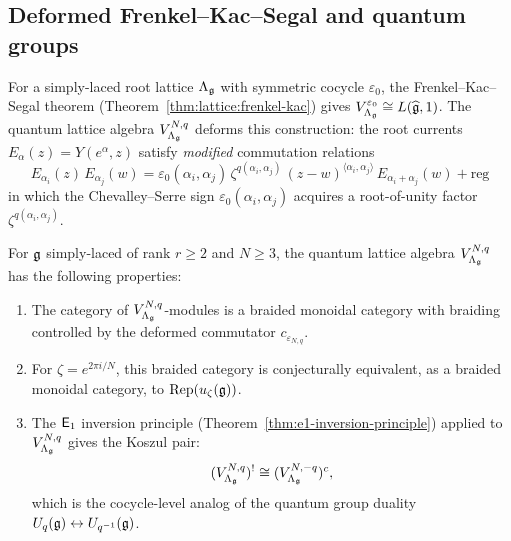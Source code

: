 \subsection{Deformed Frenkel--Kac--Segal and quantum groups}

\begin{remark}\label{rem:lattice:deformed-fks}
For a simply-laced root lattice $\Lambda_{\mathfrak{g}}$ with symmetric cocycle
$\varepsilon_0$, the Frenkel--Kac--Segal theorem
(Theorem~\ref{thm:lattice:frenkel-kac}) gives
$V_{\Lambda_{\mathfrak{g}}}^{\varepsilon_0} \cong L(\widehat{\mathfrak{g}}, 1)$.
The quantum lattice algebra $V_{\Lambda_{\mathfrak{g}}}^{N,q}$ deforms this
construction: the root currents $E_\alpha(z) = Y(e^\alpha, z)$
satisfy \emph{modified} commutation relations
\begin{equation}\label{eq:lattice:deformed-fks-ope}
E_{\alpha_i}(z)\, E_{\alpha_j}(w)
= \varepsilon_0(\alpha_i,\alpha_j)\,\zeta^{q(\alpha_i,\alpha_j)}\,
  (z-w)^{\langle\alpha_i,\alpha_j\rangle}\,
  E_{\alpha_i+\alpha_j}(w) + \text{reg}
\end{equation}
in which the Chevalley--Serre sign
$\varepsilon_0(\alpha_i,\alpha_j)$ acquires a root-of-unity factor
$\zeta^{q(\alpha_i,\alpha_j)}$.
\end{remark}

\begin{conjecture}
\label{conj:lattice:quantum-group-connection}
For $\mathfrak{g}$ simply-laced of rank $r \geq 2$ and $N \geq 3$, the quantum
lattice algebra $V_{\Lambda_{\mathfrak{g}}}^{N,q}$ has the following properties:
\begin{enumerate}[label=(\roman*)]
\item The category of $V_{\Lambda_{\mathfrak{g}}}^{N,q}$-modules is a
  braided monoidal category with braiding controlled by the
  deformed commutator $c_{\varepsilon_{N,q}}$.
\item For $\zeta = e^{2\pi i/N}$, this braided category is
  conjecturally equivalent, as a braided monoidal category, to
  $\operatorname{Rep}(u_\zeta(\mathfrak{g}))$.
\item The $\mathsf{E}_1$ inversion principle
  \textup{(}Theorem~\textup{\ref{thm:e1-inversion-principle})}
  applied to $V_{\Lambda_{\mathfrak{g}}}^{N,q}$ gives the Koszul pair:
  \[
  (V_{\Lambda_{\mathfrak{g}}}^{N,q})^!
  \cong (V_{\Lambda_{\mathfrak{g}}}^{N,-q})^c,
  \]
  which is the cocycle-level analog of the quantum group duality
  $U_q(\mathfrak{g}) \leftrightarrow U_{q^{-1}}(\mathfrak{g})$.
\end{enumerate}
\end{conjecture}


